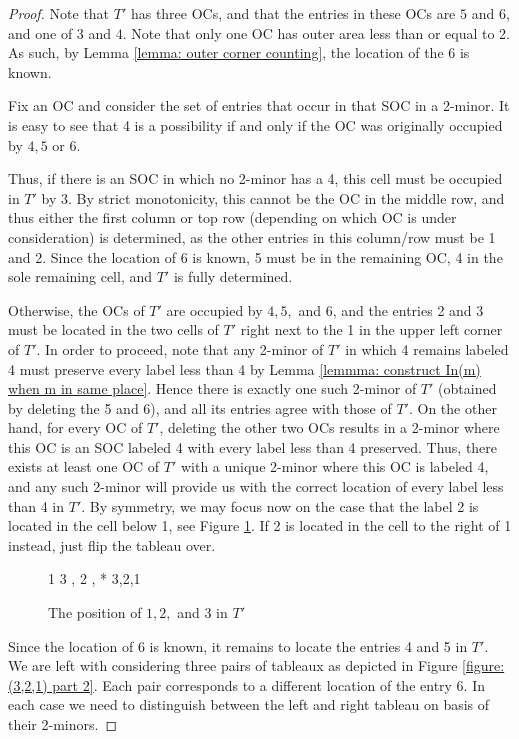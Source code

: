 \documentclass[12pt]{amsart}
\theoremstyle{definition}
\theoremstyle{remark}
\numberwithin{equation}{section}
\numberwithin{figure}{section}
\begin{document}
\begin{proof}
	Note that $T'$ has three OCs, and that the entries in these OCs are $5$ and $6$, and one of $3$ and $4$. Note that only one OC has outer area less than or equal to 2. As such, by Lemma \ref{lemma: outer corner counting}, the location of the 6 is known.
	
	Fix an OC and consider the set of entries that occur in that SOC in a 2-minor. It is easy to see that 4 is a possibility if and only if the OC was originally occupied by $4,5$ or 6.
	
	Thus, if there is an SOC in which no 2-minor has a 4, this cell must be occupied in $T'$ by 3. By strict monotonicity, this cannot be the OC in the middle row, and thus either the first column or top row (depending on which OC is under consideration) is determined, as the other entries in this column/row must be 1 and 2. Since the location of 6 is known, 5 must be in the remaining OC, 4 in the sole remaining cell, and $T'$ is fully determined.

	Otherwise, the OCs of $T'$ are occupied by $4,5,$ and 6, and the entries 2 and 3 must be located in the two cells of $T'$ right next to the 1 in the upper left corner of $T'$. In order to proceed, note that any 2-minor of $T'$ in which 4 remains labeled 4 must preserve every label less than 4 by Lemma \ref{lemmma: construct In(m) when m in same place}. Hence there is exactly one such 2-minor of $T'$ (obtained by deleting the 5 and 6), and all its entries agree with those of $T'$. On the other hand, for every OC of $T'$, deleting the other two OCs results in a 2-minor where this OC is an SOC labeled 4 with every label less than 4 preserved. Thus, there exists at least one OC of $T'$ with a unique 2-minor where this OC is labeled 4, and any such 2-minor will provide us with the correct location of every label less than 4 in $T'$. By symmetry, we may focus now on the case that the label 2 is located in the cell below 1, see Figure \ref{figure: (3,2,1) part 1}. If 2 is located in the cell to the right of 1 instead, just flip the tableau over.

    \begin{figure}[H]
		\centering
    \ytableaushort
        {1 3 \none, 2 \none,
        \none}
        * {3,2,1}
		\caption{The position of $1,2,$ and 3 in $T'$}
		\label{figure: (3,2,1) part 1}
	\end{figure}

    Since the location of 6 is known, it remains to locate the entries 4 and 5 in $T'$. We are left with considering three pairs of tableaux as depicted in Figure \ref{figure: (3,2,1) part 2}. Each pair corresponds to a different location of the entry 6. In each case we need to distinguish between the left and right tableau on basis of their 2-minors.


\end{proof}
\end{document}
